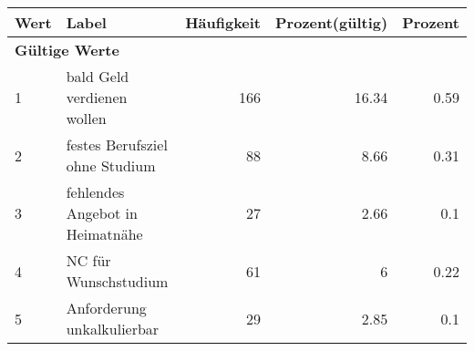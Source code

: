      \begin{longtable}{lXrrr}
     \toprule
     \textbf{Wert} & \textbf{Label} & \textbf{Häufigkeit} & \textbf{Prozent(gültig)} & \textbf{Prozent} \\
     \endhead
     \midrule
     \multicolumn{5}{l}{\textbf{Gültige Werte}}\\

     1 &
     \multicolumn{1}{X}{ bald Geld verdienen wollen   } &


       \num{166} &
       \num[round-mode=places,round-precision=2]{16,34} &
         \num[round-mode=places,round-precision=2]{0,59} \\

     2 &
     \multicolumn{1}{X}{ festes Berufsziel ohne Studium   } &


       \num{88} &
       \num[round-mode=places,round-precision=2]{8,66} &
         \num[round-mode=places,round-precision=2]{0,31} \\

     3 &
     \multicolumn{1}{X}{ fehlendes Angebot in Heimatnähe   } &


       \num{27} &
       \num[round-mode=places,round-precision=2]{2,66} &
         \num[round-mode=places,round-precision=2]{0,1} \\

     4 &
     \multicolumn{1}{X}{ NC für Wunschstudium   } &


       \num{61} &
       \num[round-mode=places,round-precision=2]{6} &
         \num[round-mode=places,round-precision=2]{0,22} \\

     5 &
     \multicolumn{1}{X}{ Anforderung unkalkulierbar   } &


       \num{29} &
       \num[round-mode=places,round-precision=2]{2,85} &
         \num[round-mode=places,round-precision=2]{0,1} \\


\end{longtable}
